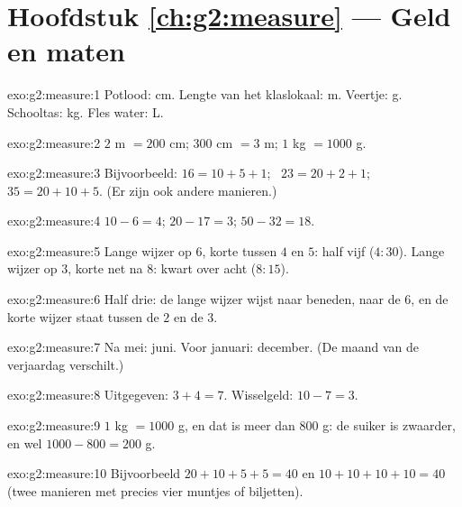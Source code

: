 \section*{Hoofdstuk \ref{ch:g2:measure} --- Geld en maten}

\begin{solution}{exo:g2:measure:1}
Potlood: cm. Lengte van het klaslokaal: m. Veertje: g. Schooltas: kg.
Fles water: L.
\end{solution}

\begin{solution}{exo:g2:measure:2}
$2$ m $= 200$ cm; \quad $300$ cm $= 3$ m; \quad $1$ kg $= 1000$ g.
\end{solution}

\begin{solution}{exo:g2:measure:3}
Bijvoorbeeld: $16 = 10 + 5 + 1$; \ $23 = 20 + 2 + 1$; \
$35 = 20 + 10 + 5$. (Er zijn ook andere manieren.)
\end{solution}

\begin{solution}{exo:g2:measure:4}
$10 - 6 = 4$; \quad $20 - 17 = 3$; \quad $50 - 32 = 18$.
\end{solution}

\begin{solution}{exo:g2:measure:5}
Lange wijzer op $6$, korte tussen $4$ en $5$: half vijf ($4{:}30$).
Lange wijzer op $3$, korte net na $8$: kwart over acht ($8{:}15$).
\end{solution}

\begin{solution}{exo:g2:measure:6}
Half drie: de lange wijzer wijst naar beneden, naar de $6$, en de korte
wijzer staat tussen de $2$ en de $3$.
\end{solution}

\begin{solution}{exo:g2:measure:7}
Na mei: juni. Voor januari: december. (De maand van de verjaardag
verschilt.)
\end{solution}

\begin{solution}{exo:g2:measure:8}
Uitgegeven: $3 + 4 = 7$. Wisselgeld: $10 - 7 = 3$.
\end{solution}

\begin{solution}{exo:g2:measure:9}
$1$ kg $= 1000$ g, en dat is meer dan $800$ g: de suiker is zwaarder, en
wel $1000 - 800 = 200$ g.
\end{solution}

\begin{solution}{exo:g2:measure:10}
Bijvoorbeeld $20 + 10 + 5 + 5 = 40$ en $10 + 10 + 10 + 10 = 40$ (twee
manieren met precies vier muntjes of biljetten).
\end{solution}
